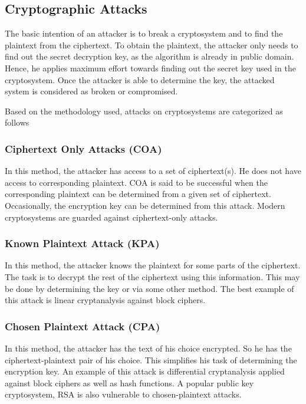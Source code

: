 \documentclass[british]{article}
\begin{document}
\pagebreak{}

\subsection{Cryptographic Attacks}

The basic intention of an attacker is to break a cryptosystem and
to find the plaintext from the ciphertext. To obtain the plaintext,
the attacker only needs to find out the secret decryption key, as
the algorithm is already in public domain. Hence, he applies maximum
effort towards finding out the secret key used in the cryptosystem.
Once the attacker is able to determine the key, the attacked system
is considered as broken or compromised.

Based on the methodology used, attacks on cryptosystems are categorized
as follows \textminus{}

\subsubsection{Ciphertext Only Attacks (COA) }

In this method, the attacker has access to a set of ciphertext(s).
He does not have access to corresponding plaintext. COA is said to
be successful when the corresponding plaintext can be determined from
a given set of ciphertext. Occasionally, the encryption key can be
determined from this attack. Modern cryptosystems are guarded against
ciphertext-only attacks.

\subsubsection{Known Plaintext Attack (KPA)}

In this method, the attacker knows the plaintext for some parts of
the ciphertext. The task is to decrypt the rest of the ciphertext
using this information. This may be done by determining the key or
via some other method. The best example of this attack is linear cryptanalysis
against block ciphers.

\subsubsection{Chosen Plaintext Attack (CPA)}

In this method, the attacker has the text of his choice encrypted.
So he has the ciphertext-plaintext pair of his choice. This simplifies
his task of determining the encryption key. An example of this attack
is differential cryptanalysis applied against block ciphers as well
as hash functions. A popular public key cryptosystem, RSA is also
vulnerable to chosen-plaintext attacks.
\end{document}
